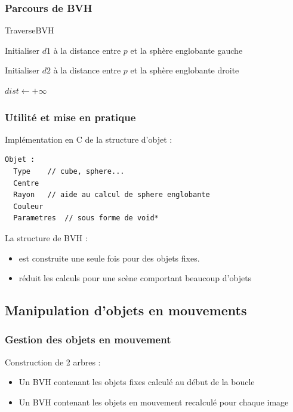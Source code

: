\begin{frame}[fragile]
\frametitle{Parcours de BVH\esp}
\tiny 
\begin{algorithm}[H]
    \caption{\textsf{TraverseBVH}}
    \BlankLine
    Initialiser $d1$ à la distance entre $p$ et la sphère englobante gauche\;

    Initialiser $d2$ à la distance entre $p$ et la sphère englobante droite\;

    $dist \gets +\infty$\;
\end{algorithm}
\end{frame}


\begin{frame}[fragile]
\frametitle{Utilité et mise en pratique}

Implémentation en C de la structure d'objet :
\begin{lstlisting}[c]
Objet :
  Type    // cube, sphere...
  Centre          
  Rayon   // aide au calcul de sphere englobante
  Couleur
  Parametres  // sous forme de void*
\end{lstlisting}
\medskip

La structure de BVH :
\begin{itemize}
    \item est construite une seule fois pour des objets fixes.
    \item réduit les calculs pour une scène comportant beaucoup d'objets
\end{itemize}

\end{frame}


\subsection{Manipulation d'objets en mouvements}
\begin{frame}[fragile]
\frametitle{Gestion des objets en mouvement}
Construction de 2 arbres : 
\begin{itemize}
    \item Un BVH contenant les objets fixes calculé au début de la boucle
    \item Un BVH contenant les objets en mouvement recalculé pour chaque image
\end{itemize}
\\[1cm]

\end{frame}


